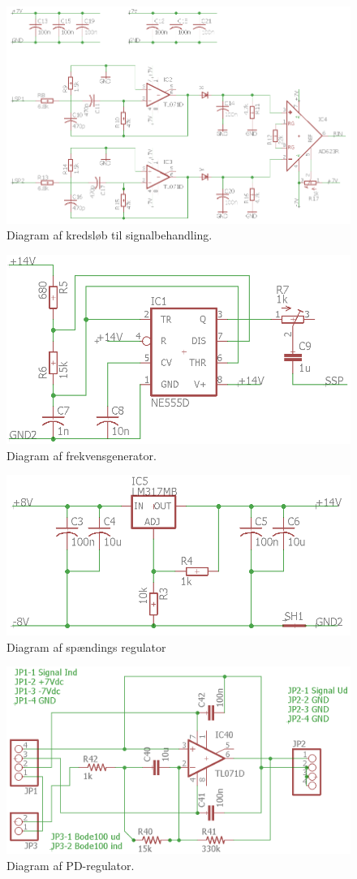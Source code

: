 \begin{figure}[h!]
	\centering
	\includegraphics[width=1\textwidth]{billeder/sch1_signal1.png}
	\caption{Diagram af kredsløb til signalbehandling.}
	\label{dig:sch1_signal1}
\end{figure}
\begin{figure}[h!]
	\centering
	\includegraphics[width=.5\textwidth]{billeder/generator.png}
	\caption{Diagram af frekvensgenerator.}
	\label{dig:generator}
\end{figure}
\begin{figure}[h!]
	\centering
	\includegraphics[width=.6\textwidth]{billeder/voltage_regulator.png}
	\caption{Diagram af spændings regulator}
	\label{dig:voltage_regulator}
\end{figure}
\begin{figure}[h!]
	\centering
	\includegraphics[width=.8\textwidth]{billeder/pd_schematic.png}
	\caption{Diagram af PD-regulator.}
	\label{dig:pd_schematic}
\end{figure}
\FloatBlock



